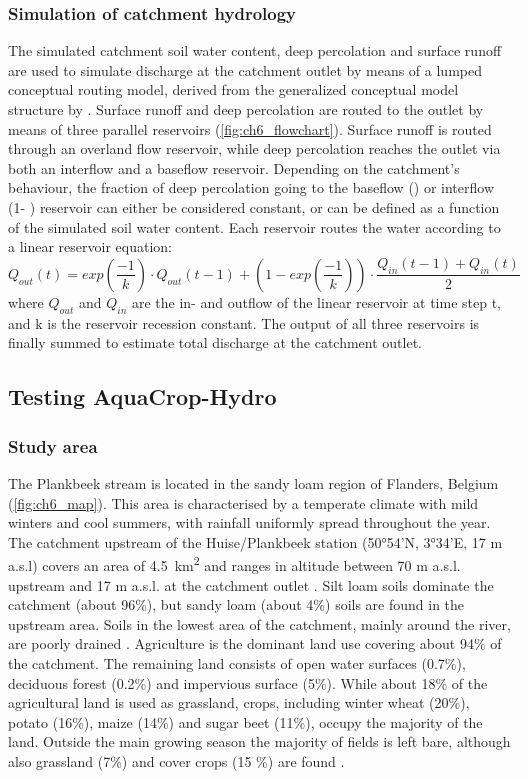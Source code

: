 \subsubsection{Simulation of catchment hydrology}
The simulated catchment soil water content, deep percolation and surface runoff are used to simulate discharge at the catchment outlet by means of a lumped conceptual routing model, derived from the generalized conceptual model structure by \textcite{willems2014a}. Surface runoff and deep percolation are routed to the outlet by means of three parallel reservoirs (\autoref{fig:ch6_flowchart}). Surface runoff is routed through an overland flow reservoir, while deep percolation reaches the outlet via both an interflow and a baseflow reservoir. Depending on the catchment's behaviour, the fraction of deep percolation going to the baseflow (\pbf) or interflow (1- \pbf) reservoir can either be considered constant, or can be defined as a function of the simulated soil water content. Each reservoir routes the water according to a linear reservoir equation: 
\small
\begin{equation}
 Q_{out}(t)=exp \left(\dfrac{-1}{k}\right) \cdot Q_{out}(t-1) + \left( 1-exp \left(\dfrac{-1}{k}\right) \right)\cdot \dfrac{Q_{in}(t-1)+Q_{in}(t)}{2} 
  \label{eq:ch6_linres}
\end{equation}
\normalsize
where $Q_{out}$ and $Q_{in}$ are the in- and outflow of the linear reservoir at time step t, and k is the reservoir recession constant. The output of all three reservoirs is finally summed to estimate total discharge at the catchment outlet.

\subsection{Testing AquaCrop-Hydro}
\subsubsection{Study area}	
The Plankbeek stream is located in the sandy loam region of Flanders, Belgium (\autoref{fig:ch6_map}). This area is characterised by a temperate climate with mild winters and cool summers, with rainfall uniformly spread throughout the year. The catchment upstream of the Huise/Plankbeek station (50°54'N, 3°34'E, 17 m a.s.l) covers an area of \SI{4.5}{km^2} and ranges in altitude between 70 m a.s.l. upstream and 17 m a.s.l. at the catchment outlet \parencite{agiv2006}. Silt loam soils dominate the catchment (about 96\%), but sandy loam (about 4\%) soils are found in the upstream area. Soils in the lowest area of the catchment, mainly around the river, are poorly drained \parencite{dov2014}. Agriculture is the dominant land use covering about 94\% of the catchment. The remaining land consists of open water surfaces (0.7\%), deciduous forest (0.2\%) and impervious surface (5\%). While about 18\% of the agricultural land is used as grassland, crops, including winter wheat (20\%), potato (16\%), maize (14\%) and sugar beet (11\%), occupy the majority of the land. Outside the main growing season the majority of fields is left bare, although also grassland (7\%) and cover crops (15 \%) are found \parencite{agiv2014, agiv2001,vlm2014}.
 
